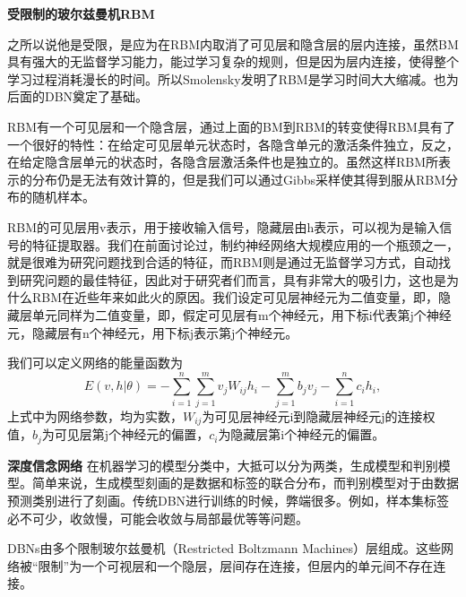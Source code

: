 \textbf{受限制的玻尔兹曼机RBM}

之所以说他是受限，是应为在RBM内取消了可见层和隐含层的层内连接，虽然BM具有强大的无监督学习能力，能过学习复杂的规则，但是因为层内连接，使得整个学习过程消耗漫长的时间。所以Smolensky发明了RBM是学习时间大大缩减。也为后面的DBN奠定了基础。

RBM有一个可见层和一个隐含层，通过上面的BM到RBM的转变使得RBM具有了一个很好的特性：在给定可见层单元状态时，各隐含单元的激活条件独立，反之，在给定隐含层单元的状态时，各隐含层激活条件也是独立的。虽然这样RBM所表示的分布仍是无法有效计算的，但是我们可以通过Gibbs采样使其得到服从RBM分布的随机样本。

RBM的可见层用v表示，用于接收输入信号，隐藏层由h表示，可以视为是输入信号的特征提取器。我们在前面讨论过，制约神经网络大规模应用的一个瓶颈之一，就是很难为研究问题找到合适的特征，而RBM则是通过无监督学习方式，自动找到研究问题的最佳特征，因此对于研究者们而言，具有非常大的吸引力，这也是为什么RBM在近些年来如此火的原因。我们设定可见层神经元为二值变量，即，隐藏层单元同样为二值变量，即，假定可见层有m个神经元，用下标i代表第j个神经元，隐藏层有n个神经元，用下标j表示第j个神经元。

我们可以定义网络的能量函数为
%
\begin{equation}
 E(v,h|\theta) = - \sum_{i=1}^n \sum_{j=1}^m v_jW_{ij}h_i - \sum_{j=1}^m b_j v_j - \sum_{i=1}^n c_i h_i,
\end{equation}
%
上式中为网络参数，均为实数，$W_{ij}$为可见层神经元i到隐藏层神经元j的连接权值，$b_j$为可见层第j个神经元的偏置，$c_i$为隐藏层第i个神经元的偏置。


\textbf{深度信念网络}
在机器学习的模型分类中，大抵可以分为两类，生成模型和判别模型。简单来说，生成模型刻画的是数据和标签的联合分布，而判别模型对于由数据预测类别进行了刻画。传统DBN进行训练的时候，弊端很多。例如，样本集标签必不可少，收敛慢，可能会收敛与局部最优等等问题。

DBNs由多个限制玻尔兹曼机（Restricted Boltzmann Machines）层组成。这些网络被“限制”为一个可视层和一个隐层，层间存在连接，但层内的单元间不存在连接。

% 

